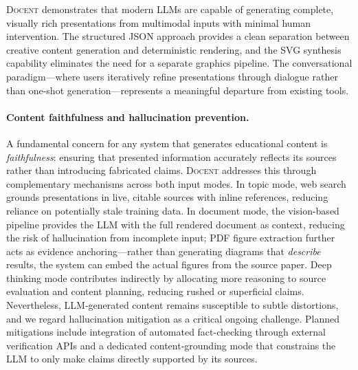 \documentclass[11pt,a4paper]{article}
\newcommand{\system}{\textsc{Docent}\xspace}
\begin{document}
\system demonstrates that modern LLMs are capable of generating complete, visually rich presentations from multimodal inputs with minimal human intervention.
The structured JSON approach provides a clean separation between creative content generation and deterministic rendering, and the SVG synthesis capability eliminates the need for a separate graphics pipeline.
The conversational paradigm---where users iteratively refine presentations through dialogue rather than one-shot generation---represents a meaningful departure from existing tools.

\paragraph{Content faithfulness and hallucination prevention.}
A fundamental concern for any system that generates educational content is \emph{faithfulness}: ensuring that presented information accurately reflects its sources rather than introducing fabricated claims.
\system addresses this through complementary mechanisms across both input modes.
In topic mode, web search grounds presentations in live, citable sources with inline references, reducing reliance on potentially stale training data.
In document mode, the vision-based pipeline provides the LLM with the full rendered document as context, reducing the risk of hallucination from incomplete input; PDF figure extraction further acts as evidence anchoring---rather than generating diagrams that \emph{describe} results, the system can embed the actual figures from the source paper.
Deep thinking mode contributes indirectly by allocating more reasoning to source evaluation and content planning, reducing rushed or superficial claims.
Nevertheless, LLM-generated content remains susceptible to subtle distortions, and we regard hallucination mitigation as a critical ongoing challenge.
Planned mitigations include integration of automated fact-checking through external verification APIs and a dedicated content-grounding mode that constrains the LLM to only make claims directly supported by its sources.
\end{document}
